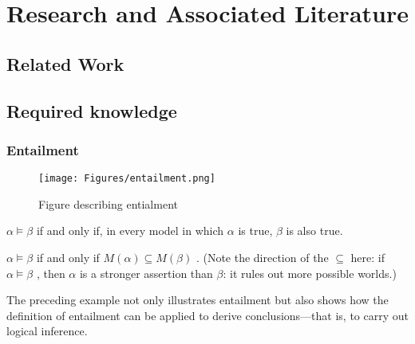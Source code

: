 \chapter{Research and Associated Literature} 
\label{chapter:Lit}

\section{Related Work}



\section{Required knowledge}


\subsection{Entailment}


\begin{figure}[H]
    \centering
    \texttt{[image: Figures/entailment.png]}
    \caption{Figure describing entialment}
    \label{fig:entailment}
\end{figure}

$\alpha \models \beta$  if and only if, in every model in which $\alpha$ is true, $\beta$ is also true.

$\alpha \models \beta$  if and only if $M (\alpha) \subseteq M (\beta)$ .
(Note the direction of the $\subseteq$ here: if $\alpha \models \beta$ , then $\alpha$ is a stronger assertion than $\beta$: it rules out more possible worlds.)

The preceding example not only illustrates entailment but also shows how the definition of entailment can be applied to derive conclusions—that is, to carry out logical inference.


